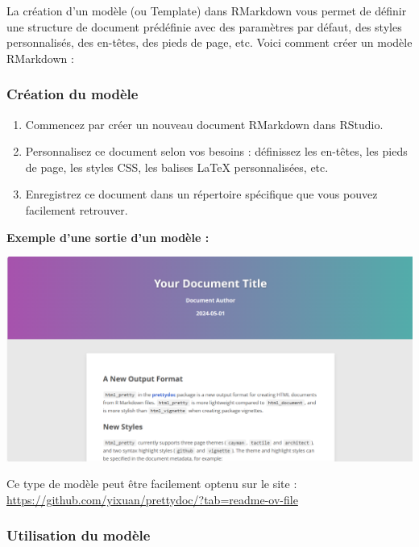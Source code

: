 \documentclass[
  12pt,
]{article}
\begin{document}
La création d'un modèle (ou Template) dans RMarkdown vous permet de
définir une structure de document prédéfinie avec des paramètres par
défaut, des styles personnalisés, des en-têtes, des pieds de page, etc.
Voici comment créer un modèle RMarkdown :

\subsubsection{Création du modèle}\label{cruxe9ation-du-moduxe8le}

\begin{enumerate}
\def\labelenumi{\arabic{enumi}.}
\item
  Commencez par créer un nouveau document RMarkdown dans RStudio.
\item
  Personnalisez ce document selon vos besoins : définissez les en-têtes,
  les pieds de page, les styles CSS, les balises LaTeX personnalisées,
  etc.
\item
  Enregistrez ce document dans un répertoire spécifique que vous pouvez
  facilement retrouver.
\end{enumerate}

\textbf{Exemple d'une sortie d'un modèle :}

\begin{center}\includegraphics[width=1\linewidth,height=1\textheight]{../Document_Rmarkdown/Images/Template_github} \end{center}

Ce type de modèle peut être facilement optenu sur le site :
\url{https://github.com/yixuan/prettydoc/?tab=readme-ov-file}

\subsubsection{Utilisation du modèle}\label{utilisation-du-moduxe8le}
\end{document}
